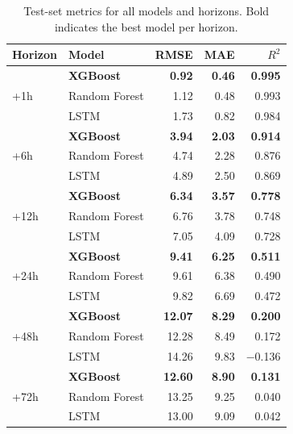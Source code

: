 \documentclass[12pt, a4paper]{article}
\begin{document}
\begin{table}[H]
\centering
\caption{Test-set metrics for all models and horizons.  Bold indicates the best model per horizon.}
\label{tab:results}
\small
\begin{tabular}{llrrr}
\toprule
\textbf{Horizon} & \textbf{Model} & \textbf{RMSE} & \textbf{MAE} & \textbf{$R^2$} \\
\midrule
\multirow{3}{*}{+1h}
  & \textbf{XGBoost}     & \textbf{0.92} & \textbf{0.46} & \textbf{0.995} \\
  & Random Forest        & 1.12          & 0.48          & 0.993 \\
  & LSTM                 & 1.73          & 0.82          & 0.984 \\
\midrule
\multirow{3}{*}{+6h}
  & \textbf{XGBoost}     & \textbf{3.94} & \textbf{2.03} & \textbf{0.914} \\
  & Random Forest        & 4.74          & 2.28          & 0.876 \\
  & LSTM                 & 4.89          & 2.50          & 0.869 \\
\midrule
\multirow{3}{*}{+12h}
  & \textbf{XGBoost}     & \textbf{6.34} & \textbf{3.57} & \textbf{0.778} \\
  & Random Forest        & 6.76          & 3.78          & 0.748 \\
  & LSTM                 & 7.05          & 4.09          & 0.728 \\
\midrule
\multirow{3}{*}{+24h}
  & \textbf{XGBoost}     & \textbf{9.41} & \textbf{6.25} & \textbf{0.511} \\
  & Random Forest        & 9.61          & 6.38          & 0.490 \\
  & LSTM                 & 9.82          & 6.69          & 0.472 \\
\midrule
\multirow{3}{*}{+48h}
  & \textbf{XGBoost}     & \textbf{12.07} & \textbf{8.29} & \textbf{0.200} \\
  & Random Forest        & 12.28          & 8.49          & 0.172 \\
  & LSTM                 & 14.26          & 9.83          & $-$0.136 \\
\midrule
\multirow{3}{*}{+72h}
  & \textbf{XGBoost}     & \textbf{12.60} & \textbf{8.90} & \textbf{0.131} \\
  & Random Forest        & 13.25          & 9.25          & 0.040 \\
  & LSTM                 & 13.00          & 9.09          & 0.042 \\
\bottomrule
\end{tabular}
\end{table}
\end{document}
